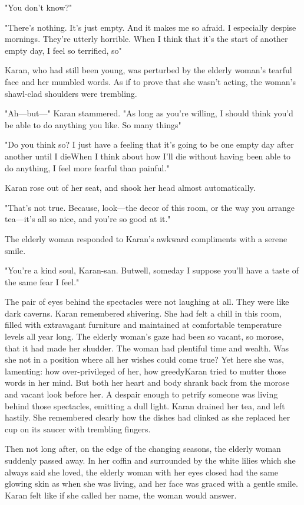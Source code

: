 "You don't know\el ?"

"There's nothing. It's just empty. And it makes me so afraid. I
especially despise mornings. They're utterly horrible. When I think that
it's the start of another empty day, I feel so terrified, so\el "

Karan, who had still been young, was perturbed by the elderly woman's
tearful face and her mumbled words. As if to prove that she wasn't
acting, the woman's shawl-clad shoulders were trembling.

"Ah---but---" Karan stammered. "As long as you're willing, I should think
you'd be able to do anything you like. So many things\el "

"Do you think so? I just have a feeling that it's going to be one empty
day after another until I die\el When I think about how I'll die
without having been able to do anything, I feel more fearful than
painful."

Karan rose out of her seat, and shook her head almost automatically.

"That's not true. Because, look---the decor of this room, or the way you
arrange tea---it's all so nice, and you're so good at it."

The elderly woman responded to Karan's awkward compliments with a serene
smile.

"You're a kind soul, Karan-san. But\el well, someday I suppose you'll
have a taste of the same fear I feel."

The pair of eyes behind the spectacles were not laughing at all. They
were like dark caverns. Karan remembered shivering. She had felt a chill
in this room, filled with extravagant furniture and maintained at
comfortable temperature levels all year long. The elderly woman's gaze
had been so vacant, so morose, that it had made her shudder. The woman
had plentiful time and wealth. Was she not in a position where all her
wishes could come true? Yet here she was, lamenting: how over-privileged
of her, how greedy\el Karan tried to mutter those words in her mind. But
both her heart and body shrank back from the morose and vacant look
before her. A despair enough to petrify someone was living behind those
spectacles, emitting a dull light. Karan drained her tea, and left
hastily. She remembered clearly how the dishes had clinked as she
replaced her cup on its saucer with trembling fingers.

Then not long after, on the edge of the changing seasons, the elderly
woman suddenly passed away. In her coffin and surrounded by the white
lilies which she always said she loved, the elderly woman with her eyes
closed had the same glowing skin as when she was living, and her face
was graced with a gentle smile. Karan felt like if she called her name,
the woman would answer.

